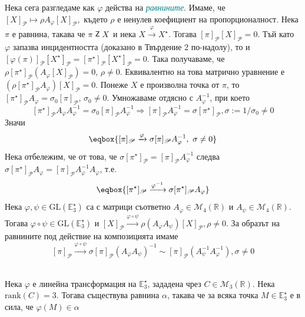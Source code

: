 \documentclass[12pt]{article}
\newcommand{\inc}{\mathrel{\raisebox{0.18ex}{\small$\mathsf{Z}$}}}
\begin{document}
Нека сега разгледаме как $\varphi$ действа на \textit{\textcolor{teal}{равнините}}. Имаме, че $[X]_{\mathcal P}\mapsto \rho A_{\varphi}[X]_{\mathcal P},$
където $\rho$ е ненулев коефициент на пропорционалност. Нека $\pi$ е равнина, такава че $\pi \inc X$ и нека $X\xrightarrow{\varphi}X^\star$. Тогава $[\pi]_{\mathscr P} [X]_{\mathcal P}=0$. Тъй като $\varphi$ запазва инцидентността (доказано в Твърдение 2 по-надолу), то и $[\varphi(\pi)]_{\mathscr P}[X^\star]_{\mathcal P}=[\pi^\star]_{\mathscr P}[ X^\star]_{\mathcal P}=0$. Така получаваме, че $\rho[\pi^\star]_{\mathscr P}( A_{\varphi}[X]_{\mathcal{P}})=0$, $\rho\neq 0$. Еквивалентно на това матрично уравнение е $(\rho[\pi^\star]_{\mathscr P} A_{\varphi})[X]_{\mathcal P}=0$. Понеже $X$ е произволна точка от $\pi$, то $[\pi^\star]_{\mathscr P} A_{\varphi}=\sigma_0[\pi]_{\mathscr P}$, $\sigma_0\neq 0$. Умножаваме отдясно с ${A}_{\varphi}^{-1}$, при което $$[\pi^\star]_{\mathscr P} A_{\varphi}{A}_{\varphi}^{-1}=\sigma_0[\pi]_{\mathscr P}{A}_{\varphi}^{-1}\Rightarrow [\pi]_{\mathscr P} A_{\varphi}^{-1}=\sigma [\pi^\star]_{\mathscr P}, \sigma:=1/\sigma_0\neq 0$$
Значи $$\eqbox{\textcolor{black}{[\pi]_{\mathscr P}\xrightarrow{\varphi}\sigma[\pi]_{\mathscr{P}} A_{\varphi}^{-1},\ \sigma\neq 0}}$$
Нека отбележим, че от това, че $\sigma[\pi^\star]_{\mathscr P}=[\pi]_{\mathscr P} A_{\varphi}^{-1}$ следва $\sigma[\pi^\star]_{\mathscr P} A_{\varphi}=[\pi]_{\mathscr P} A_{\varphi}^{-1} A_{\varphi}$, т.е. $$\eqbox{[\pi^\star]_{\mathscr P}\xrightarrow{\varphi^{-1}}\sigma[\pi^\star]_{\mathscr P} A_{\varphi}}$$
Нека $\varphi,\psi\in\mathrm{GL}(\mathbb{E}_3^\star)$ са с матрици съответно $A_\varphi\in\mathcal M_4(\mathbb{R})$ и $A_\psi\in\mathcal M_4(\mathbb{R})$. Тогава $\varphi\circ\psi\in\mathrm{GL}(\mathbb{E}_3^\star)$ и $[X]_{\mathcal{P}}\xrightarrow{\varphi\circ\psi}\rho (A_\varphi A_\psi)[X]_{\mathcal{P}}, \rho\neq 0$. За образът на равнините под действие на композицията имаме $$[\pi]_{\mathscr{P}}\xrightarrow{\varphi\circ\psi}\sigma [\pi]_{\mathscr{P}}(A_\varphi A_\psi)^{-1}\sim[\pi]_{\mathscr{P}}(A_\psi^{-1} A_\varphi^{-1}), \sigma\neq 0$$
\\
\begin{tcolorbox}[
    colback=blue!5,    %
    colframe=blue!75!black, %
    title={\textbf{Твърдение 11:}}, %
    fonttitle=\bfseries,
    boxrule=0.8pt,
    arc=1mm,           %
    top=2mm, bottom=2mm, left=3mm, right=3mm
]  Нека $\varphi$ е линейна трансформация на $\mathbb{E}_3^\star$, зададена чрез $C\in \mathcal{M}_3(\mathbb{R})$. Нека $\mathrm{rank}(C)=3$. Тогава съществува равнина $\alpha$, такава че за всяка точка $M\in\mathbb{E}_3^\star$ е в сила, че $\varphi(M)\in\alpha$
\end{tcolorbox}
\end{document}
